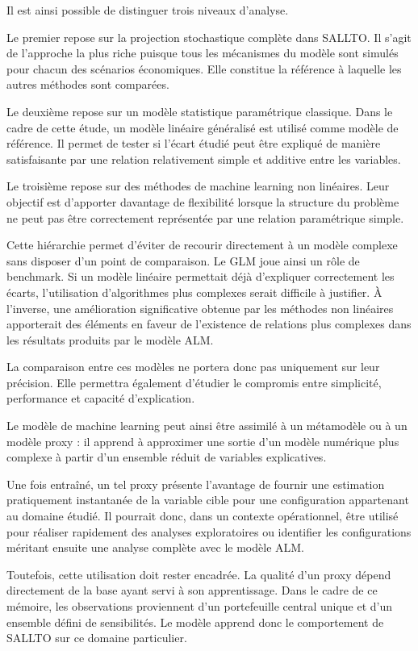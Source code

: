 Il est ainsi possible de distinguer trois niveaux d'analyse.

Le premier repose sur la projection stochastique complète dans SALLTO. Il s'agit de l'approche la plus riche puisque tous les mécanismes du modèle sont simulés pour chacun des scénarios économiques. Elle constitue la référence à laquelle les autres méthodes sont comparées.

Le deuxième repose sur un modèle statistique paramétrique classique. Dans le cadre de cette étude, un modèle linéaire généralisé est utilisé comme modèle de référence. Il permet de tester si l'écart étudié peut être expliqué de manière satisfaisante par une relation relativement simple et additive entre les variables.

Le troisième repose sur des méthodes de machine learning non linéaires. Leur objectif est d'apporter davantage de flexibilité lorsque la structure du problème ne peut pas être correctement représentée par une relation paramétrique simple.

Cette hiérarchie permet d'éviter de recourir directement à un modèle complexe sans disposer d'un point de comparaison. Le GLM joue ainsi un rôle de benchmark. Si un modèle linéaire permettait déjà d'expliquer correctement les écarts, l'utilisation d'algorithmes plus complexes serait difficile à justifier. À l'inverse, une amélioration significative obtenue par les méthodes non linéaires apporterait des éléments en faveur de l'existence de relations plus complexes dans les résultats produits par le modèle ALM.

La comparaison entre ces modèles ne portera donc pas uniquement sur leur précision. Elle permettra également d'étudier le compromis entre simplicité, performance et capacité d'explication.

Le modèle de machine learning peut ainsi être assimilé à un métamodèle ou à un modèle proxy : il apprend à approximer une sortie d'un modèle numérique plus complexe à partir d'un ensemble réduit de variables explicatives.

Une fois entraîné, un tel proxy présente l'avantage de fournir une estimation pratiquement instantanée de la variable cible pour une configuration appartenant au domaine étudié. Il pourrait donc, dans un contexte opérationnel, être utilisé pour réaliser rapidement des analyses exploratoires ou identifier les configurations méritant ensuite une analyse complète avec le modèle ALM.

Toutefois, cette utilisation doit rester encadrée. La qualité d'un proxy dépend directement de la base ayant servi à son apprentissage. Dans le cadre de ce mémoire, les observations proviennent d'un portefeuille central unique et d'un ensemble défini de sensibilités. Le modèle apprend donc le comportement de SALLTO sur ce domaine particulier.

